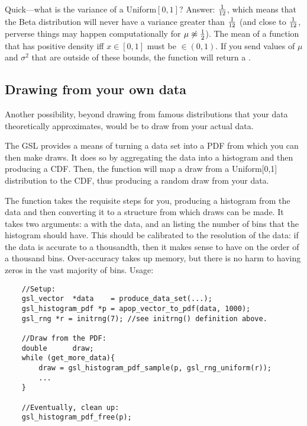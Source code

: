Quick---what is the variance of a Uniform$[0,1]$? Answer: ${1\over 12}$,
which means that the Beta distribution will never have a variance greater
than ${1\over 12}$ (and close to ${1\over 12}$, perverse things may
happen computationally for $\mu \not\approx {1\over 2}$). The mean of a
function that has positive density iff $x \in [0,1]$ must be
$\in (0,1)$. If you send  values of $\mu$
and $\sigma^2$ that are outside of these bounds, the function will
return a .

\subsection{Drawing from your own data} 
Another possibility, beyond
drawing from famous distributions that your data theoretically
approximates, would be to draw from your actual data. 

The GSL provides a means of turning a data set into a PDF from which you
can then make draws.  It
does so by aggregating the data into a histogram and then producing a CDF.
Then, the  function will
map a draw from a Uniform[0,1] distribution to the CDF, thus producing a
random draw from your data.

The  function takes the requisite steps
for you, producing a histogram from the data and then converting it to
a  structure from which draws can be
made. It takes two arguments: a  with the data, and
an  listing the number of bins that the histogram should
have. This should be calibrated to the resolution of the data: if the
data is accurate to a thousandth, then it makes sense to have on the
order  of a thousand
bins. Over-accuracy takes up memory, but there is no harm to having
zeros in the vast majority of bins. Usage:
\begin{lstlisting}
    //Setup:
    gsl_vector  *data    = produce_data_set(...);
    gsl_histogram_pdf *p = apop_vector_to_pdf(data, 1000);
    gsl_rng *r = initrng(7); //see initrng() definition above.

    //Draw from the PDF:
    double      draw;
    while (get_more_data){
        draw = gsl_histogram_pdf_sample(p, gsl_rng_uniform(r));
        ...
    }

    //Eventually, clean up:
    gsl_histogram_pdf_free(p);
\end{lstlisting}

